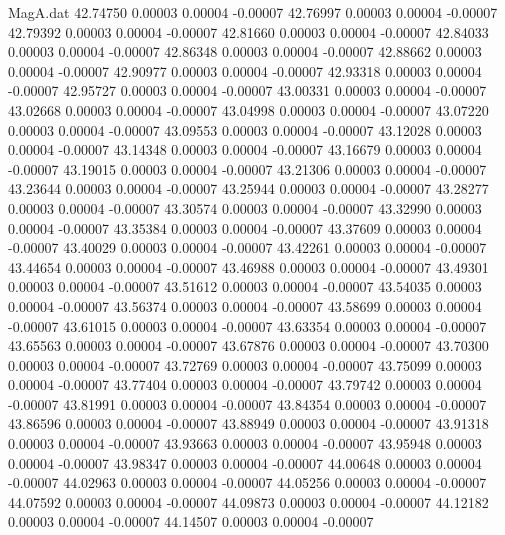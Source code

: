 \begin{filecontents}{MagA.dat}
  42.74750    0.00003    0.00004   -0.00007
  42.76997    0.00003    0.00004   -0.00007
  42.79392    0.00003    0.00004   -0.00007
  42.81660    0.00003    0.00004   -0.00007
  42.84033    0.00003    0.00004   -0.00007
  42.86348    0.00003    0.00004   -0.00007
  42.88662    0.00003    0.00004   -0.00007
  42.90977    0.00003    0.00004   -0.00007
  42.93318    0.00003    0.00004   -0.00007
  42.95727    0.00003    0.00004   -0.00007
  43.00331    0.00003    0.00004   -0.00007
  43.02668    0.00003    0.00004   -0.00007
  43.04998    0.00003    0.00004   -0.00007
  43.07220    0.00003    0.00004   -0.00007
  43.09553    0.00003    0.00004   -0.00007
  43.12028    0.00003    0.00004   -0.00007
  43.14348    0.00003    0.00004   -0.00007
  43.16679    0.00003    0.00004   -0.00007
  43.19015    0.00003    0.00004   -0.00007
  43.21306    0.00003    0.00004   -0.00007
  43.23644    0.00003    0.00004   -0.00007
  43.25944    0.00003    0.00004   -0.00007
  43.28277    0.00003    0.00004   -0.00007
  43.30574    0.00003    0.00004   -0.00007
  43.32990    0.00003    0.00004   -0.00007
  43.35384    0.00003    0.00004   -0.00007
  43.37609    0.00003    0.00004   -0.00007
  43.40029    0.00003    0.00004   -0.00007
  43.42261    0.00003    0.00004   -0.00007
  43.44654    0.00003    0.00004   -0.00007
  43.46988    0.00003    0.00004   -0.00007
  43.49301    0.00003    0.00004   -0.00007
  43.51612    0.00003    0.00004   -0.00007
  43.54035    0.00003    0.00004   -0.00007
  43.56374    0.00003    0.00004   -0.00007
  43.58699    0.00003    0.00004   -0.00007
  43.61015    0.00003    0.00004   -0.00007
  43.63354    0.00003    0.00004   -0.00007
  43.65563    0.00003    0.00004   -0.00007
  43.67876    0.00003    0.00004   -0.00007
  43.70300    0.00003    0.00004   -0.00007
  43.72769    0.00003    0.00004   -0.00007
  43.75099    0.00003    0.00004   -0.00007
  43.77404    0.00003    0.00004   -0.00007
  43.79742    0.00003    0.00004   -0.00007
  43.81991    0.00003    0.00004   -0.00007
  43.84354    0.00003    0.00004   -0.00007
  43.86596    0.00003    0.00004   -0.00007
  43.88949    0.00003    0.00004   -0.00007
  43.91318    0.00003    0.00004   -0.00007
  43.93663    0.00003    0.00004   -0.00007
  43.95948    0.00003    0.00004   -0.00007
  43.98347    0.00003    0.00004   -0.00007
  44.00648    0.00003    0.00004   -0.00007
  44.02963    0.00003    0.00004   -0.00007
  44.05256    0.00003    0.00004   -0.00007
  44.07592    0.00003    0.00004   -0.00007
  44.09873    0.00003    0.00004   -0.00007
  44.12182    0.00003    0.00004   -0.00007
  44.14507    0.00003    0.00004   -0.00007

\end{filecontents}
